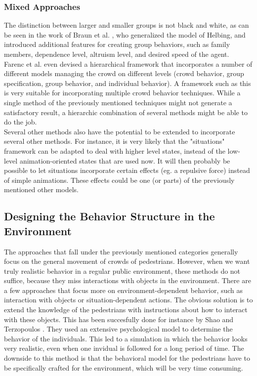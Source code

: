 \documentclass[11pt]{book}
\begin{document}
\subsubsection{Mixed Approaches}
The distinction between larger and smaller groups is not black and white, as can be seen in the work of Braun et al. \cite{10.1109CASA.2003.1199317}, who generalized the model of Helbing, and introduced additional features for creating group behaviors, such as family members, dependence level, altruism level, and desired speed of the agent.\\
Farenc et al. even devised a hierarchical framework that incorporates a number of different models managing the crowd on different levels (crowd behavior, group specification, group behavior, and individual behavior). A framework such as this is very suitable for incorporating multiple crowd behavior techniques. While a single method of the previously mentioned techniques might not generate a satisfactory result, a hierarchic combination of several methods might be able to do the job.\\
Several other methods also have the potential to be extended to incorporate several other methods. For instance, it is very likely that the "situations" framework can be adapted to deal with higher level states, instead of the low-level animation-oriented states that are used now. It will then probably be possible to let situations incorporate certain effects (eg. a repulsive force) instead of simple animations. These effects could be one (or parts) of the previously mentioned other models.



\subsection{Designing the Behavior Structure in the Environment}
The approaches that fall under the previously mentioned categories generally focus on the general movement of crowds of pedestrians. However, when we want truly realistic behavior in a regular public environment, these methods do not suffice, because they miss interactions with objects in the environment. There are a few approaches that focus more on environment-dependent behavior, such as interaction with objects or situation-dependent actions.
The obvious solution is to extend the knowledge of the pedestrians with instructions about how to interact with these objects. This has been succesfully done for instance by Shao and Terzopoulos \cite{A_autonomouspedestrians}. They used an extensive psychological model to determine the behavior of the individuals. This led to a simulation in which the behavior looks very realistic, even when one invidual is followed for a long period of time. The downside to this method is that the behavioral model for the pedestrians have to be specifically crafted for the environment, which will be very time consuming.
\end{document}
